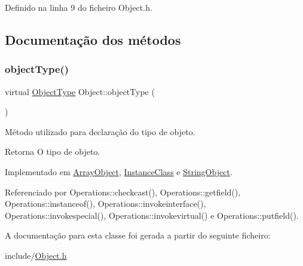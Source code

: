 Definido na linha 9 do ficheiro Object.\+h.



\subsection{Documentação dos métodos}
\mbox{\label{classObject_a08cee945bc224fc81f4448086625183d}} 
\subsubsection{\texorpdfstring{object\+Type()}{objectType()}}
{\footnotesize\ttfamily virtual \hyperlink{BasicTypes_8h_a842c5e2e69277690b064bf363c017980}{Object\+Type} Object\+::object\+Type (\begin{DoxyParamCaption}{ }\end{DoxyParamCaption})\hspace{0.3cm}{\ttfamily [pure virtual]}}



Método utilizado para declaração do tipo de objeto. 

\begin{DoxyReturn}{Retorna}
O tipo de objeto. 
\end{DoxyReturn}


Implementado em \hyperlink{classArrayObject_a63034d166dcd6caad9261c86c338a417}{Array\+Object}, \hyperlink{classInstanceClass_ae8570307f49cb95cc01fb8d6bda23763}{Instance\+Class} e \hyperlink{classStringObject_a7d89db7df43b17354baf5337edd636b7}{String\+Object}.



Referenciado por Operations\+::checkcast(), Operations\+::getfield(), Operations\+::instanceof(), Operations\+::invokeinterface(), Operations\+::invokespecial(), Operations\+::invokevirtual() e Operations\+::putfield().



A documentação para esta classe foi gerada a partir do seguinte ficheiro\+:\begin{DoxyCompactItemize}
\item 
include/\hyperlink{Object_8h}{Object.\+h}\end{DoxyCompactItemize}
